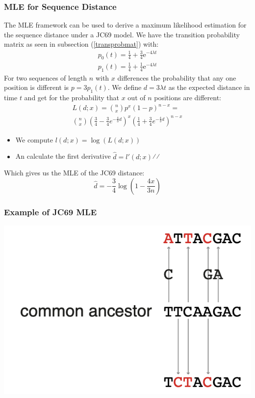 \documentclass{article}
\begin{document}
\begin{multicols*}{3}
\subsubsection{MLE for Sequence Distance}
The MLE framework can be used to derive a maximum likelihood estimation for the sequence distance under a JC69 model. 
We have the transition probability matrix as seen in subsection (\ref{transprobmat}) with:
\begin{align*}
    p_0(t) = \frac{1}{4} + \frac{3}{4}\text{e}^{-4\lambda t}\\
    p_1(t) = \frac{1}{4} + \frac{1}{4}\text{e}^{-4\lambda t}
\end{align*}
For two sequences of length $n$ with $x$ differences the probability that any one position is different is $p = 3p_1(t)$. We define $d = 3\lambda t$ as the expected distance in time $t$ and get for the probability that $x$ out of $n$ positions are different: \begin{align*}
L(d;x) = {n \choose x} p^{x}(1-p)^{n-x}=\\
{n \choose x}
\left(\frac{3}{4}-\frac{3}{4} e^{-\frac{4}{3} d}\right)^{x}\left(\frac{1}{4}+\frac{3}{4} e^{-\frac{4}{3} d}\right)^{n-x}
\end{align*}
\begin{itemize}
    \item We compute $l(d;x) = \log(L(d;x))$
    \item An calculate the first derivative $\hat{d} = l'(d;x)$⁄⁄
\end{itemize}

Which gives us the MLE of the JC69 distance: 
$$\hat{d} = -\frac{3}{4}\log\left(1-\frac{4x}{3n}\right)$$

\subsubsection{Example of JC69 MLE}

\begin{center}
    \includegraphics[width=0.5\linewidth]{mlejc69.png}
\end{center}


\end{multicols*}
\end{document}
